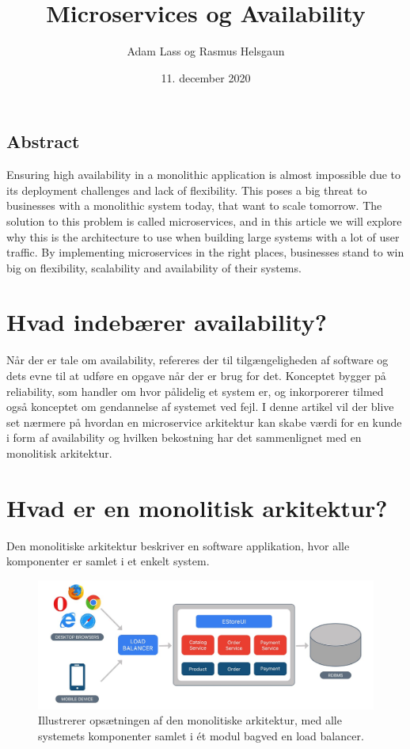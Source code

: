 \documentclass{article}
\title{Microservices og Availability}
\author{Adam Lass og Rasmus Helsgaun}
\date{11. december 2020}
\begin{document}
\maketitle
\begin{flushleft}
\subsection*{Abstract}

Ensuring high availability in a monolithic application is almost impossible due to its deployment challenges and lack of flexibility. This poses a big threat to businesses with a monolithic system today, that want to scale tomorrow. The solution to this problem is called microservices, and in this article we will explore why this is the architecture to use when building large systems with a lot of user traffic. By implementing microservices in the right places, businesses stand to win big on flexibility, scalability and availability of their systems.

\section*{Hvad indebærer availability?}

Når der er tale om availability, refereres der til tilgængeligheden af software og dets evne til at udføre en opgave når der er brug for det. Konceptet bygger på reliability, som handler om hvor pålidelig et system er, og inkorporerer tilmed også konceptet om gendannelse af systemet ved fejl. I denne artikel vil der blive set nærmere på hvordan en microservice arkitektur kan skabe værdi for en kunde i form af availability og hvilken bekostning har det sammenlignet med en monolitisk arkitektur.

\newpage
\section*{Hvad er en monolitisk arkitektur?}

Den monolitiske arkitektur beskriver en software applikation, hvor alle komponenter er samlet i et enkelt system. \linebreak

\begin{figure}[H]
    \captionsetup{justification=raggedright,singlelinecheck=false}
    \includegraphics[width=\textwidth]{monolithic load balance.jpeg}
    \caption{Illustrerer opsætningen af den monolitiske arkitektur, med alle systemets komponenter samlet i ét modul bagved en load balancer.\cite{mono2} \label{figure:mono load balance}}
\end{figure}


\end{flushleft}
\end{document}
